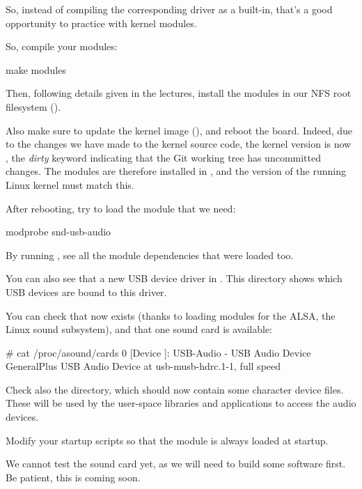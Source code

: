 {So, instead of compiling the corresponding driver as a built-in, that's
a good opportunity to practice with kernel modules.

So, compile your modules:
\begin{bashinput}
make modules
\end{bashinput}

Then, following details given in the lectures, install the modules in our NFS
root filesystem ().

Also make sure to update the kernel image (), and reboot the
board.  Indeed, due to the changes we have made to the kernel source code,
the kernel version is now , the {\em dirty}
keyword indicating that the Git working tree has uncommitted changes.
The modules are therefore installed in ,
and the version of the running Linux kernel must match this.

After rebooting, try to load the module that we need:

\begin{bashinput}
modprobe snd-usb-audio
\end{bashinput}

By running , see all the module dependencies that
were loaded too.

You can also see that a new USB device driver in
. This directory shows which
USB devices are bound to this driver.

You can check that  now exists (thanks to loading
modules for the ALSA, the Linux sound subsystem), and that one sound
card is available:

\begin{bashinput}
# cat /proc/asound/cards
 0 [Device         ]: USB-Audio - USB Audio Device
                      GeneralPlus USB Audio Device at usb-musb-hdrc.1-1, full speed
\end{bashinput}

Check also the  directory, which should now contain
some character device files. These will be used by the user-space
libraries and applications to access the audio devices.

Modify your startup scripts so that the  module
is always loaded at startup.

We cannot test the sound card yet, as we will need to build some
software first. Be patient, this is coming soon.

}
